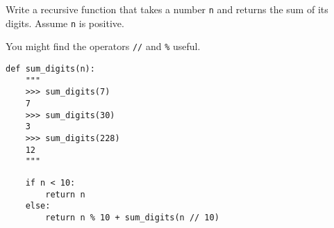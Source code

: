 \question Write a recursive function that takes a number {\tt n} and
returns the sum of its digits. Assume {\tt n} is positive.

You might find the operators \texttt{//} and \texttt{\%} useful.
\begin{lstlisting}
def sum_digits(n):
    """
    >>> sum_digits(7)
    7
    >>> sum_digits(30)
    3
    >>> sum_digits(228)
    12
    """
\end{lstlisting}

\begin{solution}[1in]
\begin{lstlisting}
    if n < 10:
        return n 
    else:
        return n % 10 + sum_digits(n // 10)
\end{lstlisting}
\end{solution}
